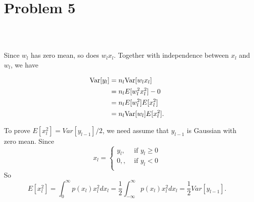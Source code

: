 \section{Problem 5}~\label{sec:prob5}

\subsection{} %

\subsection{} %

Since $w_l$ has zero mean,
so does $w_l x_l$.
Together with independence between $x_l$ and $w_l$,
we have

\begin{equation}
\begin{split}
    {\mathop{\mathrm{Var}}}[y_l] &= n_l {\mathop{\mathrm{Var}}}[w_l x_l] \\
        &=n_l E[w_l^2 x_l^2] - 0 \\
        &=n_l E[w_l^2] E[x_l^2] \\
        &=n_l {\mathop{\mathrm{Var}}}[w_l] E[x_l^2].
\end{split}
\end{equation}

To prove $E[x_l^2]=Var[y_{l-1}]/2$,
we need assume that $y_{l-1}$ is Gaussian with zero mean.
Since
\begin{equation}
    x_l = \begin{cases}
        y_l, &\text{ if }y_l\ge0\\
        0, , &\text{ if }y_l<0\\
    \end{cases}
\end{equation}
So
\begin{equation}
    E[x_l^2] = \int_0^\infty p(x_l)x_l^2 dx_l
        = \frac{1}{2}\int_{-\infty}^\infty p(x_l)x_l^2 dx_l
        = \frac{1}{2}Var[y_{l-1}].
\end{equation}

\subsection{} %

\subsection{} %

